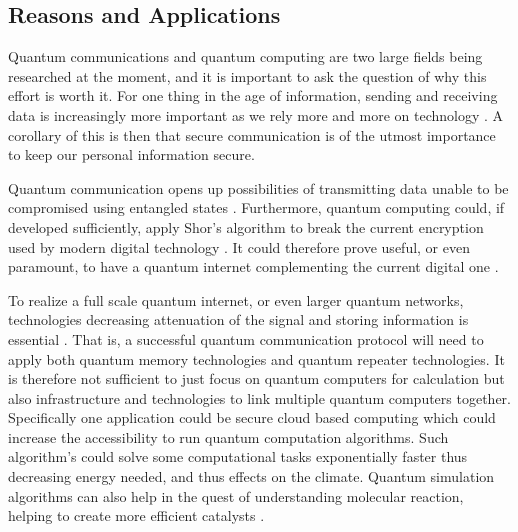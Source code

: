 \subsection{Reasons and Applications}
Quantum communications and quantum computing are two large fields being researched at the moment, and it is important to ask the question of why this effort is worth it. For one thing in the age of information, sending and receiving data is increasingly more important as we rely more and more on technology \cite{Azuma:2023}. A corollary of this is then that secure communication is of the utmost importance to keep our personal information secure. \cite{Hu:2023}

Quantum communication opens up possibilities of transmitting data unable to be compromised using entangled states \cite{Hu:2023}. Furthermore, quantum computing could, if developed sufficiently, apply Shor's algorithm to break the current encryption used by modern digital technology \cite{Nielsen:2010}. It could therefore prove useful, or even paramount, to have a quantum internet complementing the current digital one \cite{Azuma:2023}.

To realize a full scale quantum internet, or even larger quantum networks, technologies decreasing attenuation of the signal and storing information is essential \cite{Azuma:2023}. That is, a successful quantum communication protocol will need to apply both quantum memory technologies and quantum repeater technologies. It is therefore not sufficient to just focus on quantum computers for calculation but also infrastructure and technologies to link multiple quantum computers together. Specifically one application could be secure cloud based computing \cite{Azuma:2023} which could increase the accessibility to run quantum computation algorithms. Such algorithm's could solve some computational tasks exponentially faster thus decreasing energy needed, and thus effects on the climate. Quantum simulation algorithms can also help in the quest of understanding molecular reaction, helping to create more efficient catalysts \cite{Outeiral:2021}.
